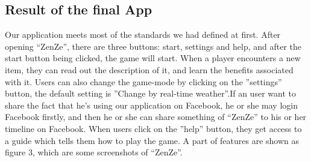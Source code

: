 \documentclass{sigchi}
\begin{document}
%
%
%
%
%

\subsection{Result of the final App}
Our application meets most of the standards we had defined at first. After opening ``ZenZe'', there are three buttons: start, settings and help, and after the start button being clicked, the game will start. When a player encounters a new item, they can read out the description of it, and learn the benefits associated with it. Users can also change the game-mode by clicking on the ''settings'' button, the default setting is ''Change by real-time weather''.If an user want to share the fact that he's using our application on Facebook, he or she may login Facebook firstly, and then he or she can share something of ``ZenZe'' to his or her timeline on Facebook. When users click on the ''help'' button, they get access to a guide which tells them how to play the game. A part of features are shown as figure 3, which are some screenshots of ``ZenZe''.
\end{document}
